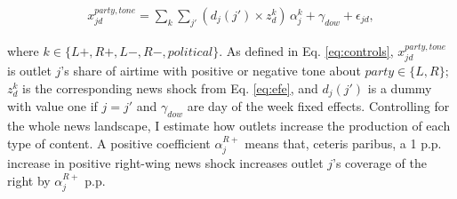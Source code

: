 \documentclass[12pt]{article}
\begin{document}

\begin{equation}\label{eq:first_stage}
	\begin{aligned}
		 x^{party, tone}_{jd} =	\sum_{k} \sum_{j'}
		\left(d_j(j') \times z^{k}_d\right)\,\alpha_{j}^{k}
		+ \gamma_{dow}+\epsilon_{jd},
	\end{aligned}
\end{equation}

where $k \in\{L+,R+,L-,R-, political\}$. As defined in Eq. \eqref{eq:controls},  $x^{party, tone}_{jd}$ is outlet $j$’s share of airtime with positive or negative tone about $party \in \{L,R\}$;  $z^{k}_d$ is the corresponding news shock from Eq. \eqref{eq:efe}, and $d_j(j')$ is a dummy with value one if $j=j'$ and $\gamma_{dow}$ are day of the week fixed effects.  Controlling for the whole news landscape, I estimate how outlets increase the production of each type of content.
A positive coefficient $\alpha_{j}^{R+}$ means that, ceteris paribus, a 1 p.p. increase in  positive right-wing news shock increases outlet $j$’s coverage of the right by $\alpha_{j}^{R+}$ p.p.
\end{document}
